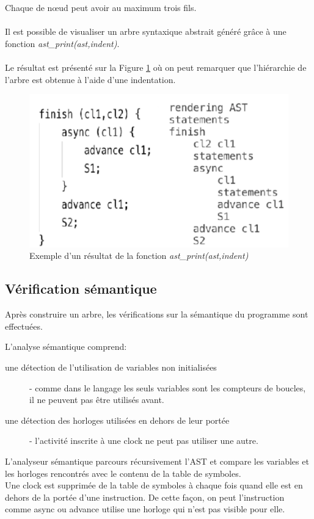 \documentclass[12pt]{scrartcl}
\begin{document}
Chaque de nœud peut avoir au maximum trois fils. \\\\ Il est possible de visualiser un arbre syntaxique abstrait généré grâce à une fonction \textit{ast\_print(ast,indent)}. 
\\\\Le résultat est présenté sur la Figure \ref{fig:ast} où on peut remarquer que l'hiérarchie de l'arbre est obtenue à l'aide d'une indentation.
\begin{figure}[h]
  \includegraphics[scale=0.5]{ast_exemple}
  \centering
  \caption{Exemple d'un résultat de la fonction \textit{ast\_print(ast,indent)}}
  \centering
  \label{fig:ast}
\end{figure}

\newpage

\subsection{Vérification sémantique}
Après construire un arbre, les vérifications sur la sémantique du programme sont effectuées. 

L'analyse sémantique comprend: 


\begin{description}
  \item[une détection de l'utilisation de variables non initialisées] - comme dans le langage les seuls variables sont les compteurs de boucles, il ne peuvent pas être utilisés avant.
  \item[une détection des horloges utilisées en dehors de leur portée] - l'activité inscrite à une clock ne peut pas utiliser une autre.
\end{description}

L'analyseur sémantique parcours récursivement l'AST et compare les variables et les horloges rencontrés avec le contenu de la table de symboles.\\
Une clock est supprimée de la table de symboles à chaque fois quand elle est en dehors de la portée d'une instruction. De cette façon, on peut l'instruction comme async ou advance utilise 
une horloge qui n'est pas visible pour elle.
\end{document}
